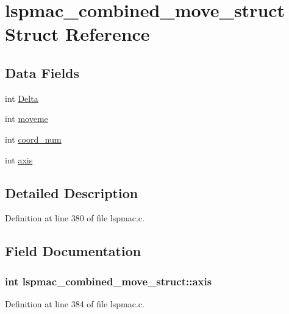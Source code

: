 \hypertarget{structlspmac__combined__move__struct}{\section{lspmac\-\_\-combined\-\_\-move\-\_\-struct Struct Reference}
\label{structlspmac__combined__move__struct}
}
\subsection*{Data Fields}
\begin{DoxyCompactItemize}
\item 
int \hyperlink{structlspmac__combined__move__struct_a5389f07fcf2b24b0e912aefb4141001d}{Delta}
\item 
int \hyperlink{structlspmac__combined__move__struct_a650f35e534bd22bdb45d5361f75eaae8}{moveme}
\item 
int \hyperlink{structlspmac__combined__move__struct_a2ae011832de3009f7a08b3081b51b7a3}{coord\-\_\-num}
\item 
int \hyperlink{structlspmac__combined__move__struct_afedb95467295e8a6aa535974f5ad6300}{axis}
\end{DoxyCompactItemize}


\subsection{Detailed Description}


Definition at line 380 of file lspmac.\-c.



\subsection{Field Documentation}
\hypertarget{structlspmac__combined__move__struct_afedb95467295e8a6aa535974f5ad6300}{
\subsubsection[{axis}]{\setlength{\rightskip}{0pt plus 5cm}int lspmac\-\_\-combined\-\_\-move\-\_\-struct\-::axis}}\label{structlspmac__combined__move__struct_afedb95467295e8a6aa535974f5ad6300}


Definition at line 384 of file lspmac.\-c.

